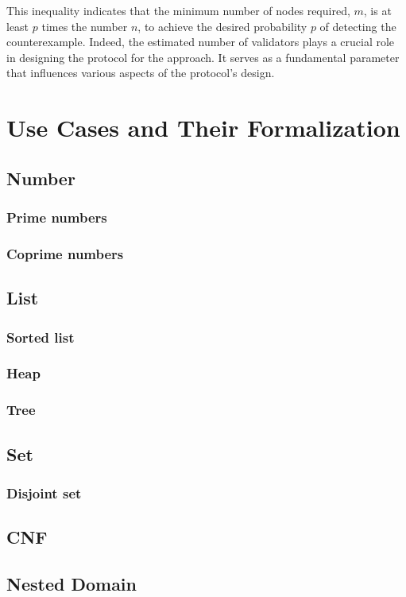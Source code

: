 \documentclass[runningheads]{llncs}
\begin{document}
This inequality indicates that the minimum number of nodes required, $m$, is at least $p$ times the number $n$, to achieve the desired probability $p$ of detecting the counterexample. Indeed, the estimated number of validators plays a crucial role in designing the protocol for the approach. It serves as a fundamental parameter that influences various aspects of the protocol's design.
\section{Use Cases and Their Formalization}
\subsection{Number}
\subsubsection{Prime numbers}
\subsubsection{Coprime numbers}
\subsection{List}
\subsubsection{Sorted list}
\subsubsection{Heap}
\subsubsection{Tree}
\subsection{Set}
\subsubsection{Disjoint set}
\subsection{CNF}
\subsection{Nested Domain}
\end{document}
